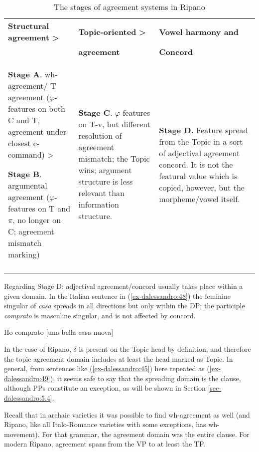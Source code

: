 \documentclass[output=paper
,modfonts
,nonflat]{langsci/langscibook}
\begin{document}
\begin{table}
	\caption{The stages of agreement systems in Ripano}
	\label{tab-dalessandro:3}
\begin{tabularx}{\textwidth}{XXX}
\lsptoprule
\textbf{Structural agreement}  \textbf{>} & \textbf{Topic-oriented} \textbf{>}    & \textbf{Vowel harmony and}\\ {}& \textbf{agreement} & \textbf{Concord}\\
\midrule
\textbf{Stage A}. wh-agreement/ T agreement ($\varphi $-features on both C and T, agreement under closest c-command) >

\textbf{Stage B}. argumental agreement ($\varphi $-features on T and $\pi $, no longer on C; agreement mismatch marking) &  \textbf{Stage C}. $\varphi $-features on T-v, but different resolution of agreement mismatch; the Topic wins; \newline argument structure is less relevant than information structure. &  \textbf{Stage D.} Feature spread from the Topic in a sort of adjectival agreement concord. It is not the featural value which is copied, however, but the morpheme/vowel itself.\\
\lspbottomrule
\end{tabularx}
\end{table}
\newpage\noindent Regarding Stage D: adjectival agreement/concord usually takes place within a given domain. In the Italian sentence in (\ref{ex-dalessandro:48}) the feminine singular of \textit{casa} spreads in all directions but only within the DP; the participle \textit{comprato} is masculine singular, and is not affected by concord. 

\begin{exe}
\ex\label{ex-dalessandro:48} Ho comprato [una bella casa nuova]
\end{exe}
In the case of Ripano, $\delta $ is present on the Topic head by definition, and therefore the topic agreement domain includes at least the head marked as Topic. In general, from sentences like (\ref{ex-dalessandro:45}) here repeated as (\ref{ex-dalessandro:49}), it seems safe to say that the spreading domain is the clause, although PPs constitute an exception, as will be shown in Section \ref{sec-dalessandro:5.4}.

Recall that in archaic varieties it was possible to find wh-agreement as well (and Ripano, like all Italo-Romance varieties with some exceptions, has wh-movement). For that grammar, the agreement domain was the entire clause. For modern Ripano, agreement spans from the VP to at least the TP. 
\end{document}
